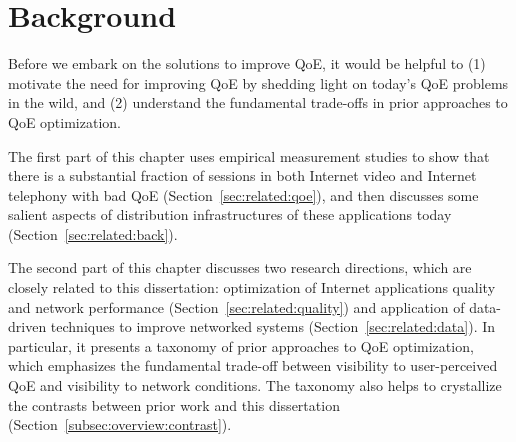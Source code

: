 \chapter{Background}
\label{ch:related}

%
%

Before we embark on the solutions to improve QoE, it would be helpful
to (1) motivate the need for improving QoE by shedding
light on today's QoE problems in the wild, and (2) understand the 
fundamental trade-offs in prior approaches to QoE optimization.

The first part of this chapter uses empirical measurement studies to 
show that there is a substantial fraction of sessions in both Internet 
video and Internet telephony with bad QoE  
(Section~\ref{sec:related:qoe}), and then discusses 
some salient aspects of distribution infrastructures of these
applications today (Section~\ref{sec:related:back}).

The second part of this chapter discusses two research directions, 
which are closely related to this dissertation:
optimization of Internet applications quality and network performance
(Section~\ref{sec:related:quality}) and application of data-driven 
techniques to improve networked systems (Section~\ref{sec:related:data}). 
In particular, it presents a taxonomy of prior approaches to QoE optimization, 
which emphasizes the fundamental trade-off between visibility to 
user-perceived QoE and visibility to network conditions.
The taxonomy also helps to crystallize the contrasts between
prior work and this dissertation (Section~\ref{subsec:overview:contrast}).

